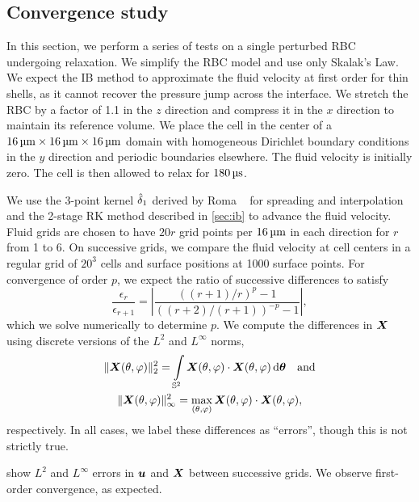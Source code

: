 \subsection{Convergence study}\label{sec:convergence}

In this section, we perform a series of tests on a single perturbed RBC undergoing relaxation. We simplify the RBC
model and use only Skalak's Law. We expect the IB method to approximate the fluid velocity at first order for thin
shells, as it cannot recover the pressure jump across the interface. We stretch the RBC by a factor of 1.1 in the
$z$ direction and compress it in the $x$ direction to maintain its reference volume. We place the cell in the
center of a $16\um\times16\um\times16\um$ domain with homogeneous Dirichlet boundary conditions in the $y$
direction and periodic boundaries elsewhere. The fluid velocity is initially zero. The cell is then allowed to
relax for $180\us$.

We use the 3-point kernel $\hat{\delta}_1$ derived by Roma ~\cite{Roma:1999tx} for spreading and
interpolation and the 2-stage RK method described in \cref{sec:ib} to advance the fluid velocity. Fluid grids are
chosen to have $20r$ grid points per $16\um$ in each direction for $r$ from 1 to 6. On successive grids, we
compare the fluid velocity at cell centers in a regular grid of $20^3$ cells and surface positions at 1000 surface
points. For convergence of order $p$, we expect the ratio of successive differences to satisfy
\begin{equation}
    \frac{\epsilon_r}{\epsilon_{r+1}} = \left|\frac{{((r+1)/r)}^p-1}{{((r+2)/(r+1))}^{-p}-1}\right|,
\end{equation}
which we solve numerically to determine $p$. We compute the differences in $\boldsymbol{X}$ using discrete versions of the $L^2$
and $L^\infty$ norms,
\begin{gather}
    \|\X(\theta, \varphi)\|_2^2 =
    \int\limits_{\sphere} \X(\theta, \varphi)\cdot\X(\theta, \varphi) \d\qs \quad\text{and} \\
    \|\X(\theta, \varphi)\|_\infty^2 =
    \max_{(\theta, \varphi)} \X(\theta, \varphi)\cdot\X(\theta, \varphi),
\end{gather}
respectively. In all cases, we label these differences as ``errors'', though this is not strictly true.

 show $L^2$ and $L^\infty$ errors in $\boldsymbol{u}$ and $\boldsymbol{X}$ between successive grids. We observe first-order convergence, as expected. 


